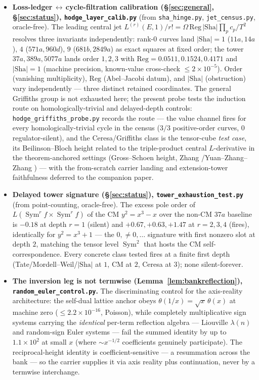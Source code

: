 \documentclass[11pt]{article}
\theoremstyle{definition}
\newcommand{\Sym}{\operatorname{Sym}}
\newcommand{\Sha}{\mathrm{Sha}}
\begin{document}
\begin{itemize}
\item \textbf{Loss-ledger\,$\leftrightarrow$\,cycle-filtration calibration (\S\ref{sec:general},
\S\ref{sec:status}), \texttt{hodge\_layer\_calib.py}} (from \texttt{sha\_hinge.py}, \texttt{jet\_census.py},
oracle-free). The leading central jet $L^{(r)}(E,1)/r!=\Omega\,\mathrm{Reg}\,|\Sha|\prod_p c_p/T^2$ resolves
three invariants independently: rank-$0$ curves land $|\Sha|=1$ ($11a,14a$), $4$ ($571a,960d$), $9$
($681b,2849a$) as exact squares at fixed order; the tower $37a,389a,5077a$ lands order $1,2,3$ with
$\mathrm{Reg}=0.0511,0.1524,0.4171$ and $|\Sha|=1$ (machine precision, known-value cross-check $\le
2\times10^{-5}$). Order (vanishing multiplicity), $\mathrm{Reg}$ (Abel--Jacobi datum), and $|\Sha|$
(obstruction) vary independently --- three distinct retained coordinates. The general Griffiths group is
not exhausted here; the present probe tests the induction route on homologically-trivial and delayed-depth
controls: \texttt{hodge\_griffiths\_probe.py} records the route
--- the value channel fires for every homologically-trivial cycle in the census ($3/3$ positive-order
curves, $0$ regulator-silent), and the Ceresa/Griffiths class is the tensor-cube \emph{test case}, its
Beilinson--Bloch height related to the triple-product central $L$-derivative in the theorem-anchored
settings (Gross--Schoen height, Zhang \cite{ZhangGS}/Yuan--Zhang--Zhang \cite{YZZ}) --- with the
from-scratch carrier landing and extension-tower faithfulness deferred to the companion paper.

\item \textbf{Delayed tower signature (\S\ref{sec:status}), \texttt{tower\_exhaustion\_test.py}}
(from point-counting, oracle-free). The excess pole order of $L(\Sym^r f\times\Sym^r f)$ of the CM
$y^2=x^3-x$ over the non-CM $37a$ baseline is $-0.18$ at depth $r=1$ (silent) and $+0.67,+0.63,+1.47$ at
$r=2,3,4$ (fires), identically for $y^2=x^3+1$ --- the $0,\neq0,\dots$ signature with first nonzero slot
at depth $2$, matching the tensor level $\Sym^2$ that hosts the CM self-correspondence. Every concrete
class tested fires at a finite first depth (Tate/Mordell--Weil/$|\Sha|$ at $1$, CM at $2$, Ceresa at $3$);
none silent-forever.

\item \textbf{The inversion leg is not termwise (Lemma~\ref{lem:bankreflection}),
\texttt{random\_euler\_control.py}.} The discriminating control for the axis-reality architecture: the
self-dual lattice anchor obeys $\theta(1/x)=\sqrt x\,\theta(x)$ at machine zero ($\le2.2\times10^{-16}$,
Poisson), while completely multiplicative sign systems carrying the \emph{identical} per-term reflection
algebra --- Liouville $\lambda(n)$ and random-sign Euler systems --- fail the summed identity by up to
$1.1\times10^{2}$ at small $x$ (where $\sim x^{-1/2}$ coefficients genuinely participate). The
reciprocal-height identity is coefficient-sensitive --- a resummation across the bank --- so the carrier
supplies it via axis reality plus continuation, never by a termwise interchange.


\end{itemize}
\end{document}
